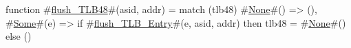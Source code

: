 function #\hyperref[sailRISCVzflushzyTLB48]{flush\_TLB48}#(asid, addr) =
  match (tlb48) {
    #\hyperref[sailRISCVzNone]{None}#()  => (),
    #\hyperref[sailRISCVzSome]{Some}#(e) => if   #\hyperref[sailRISCVzflushzyTLBzyEntry]{flush\_TLB\_Entry}#(e, asid, addr)
               then tlb48 = #\hyperref[sailRISCVzNone]{None}#()
               else ()
  }
